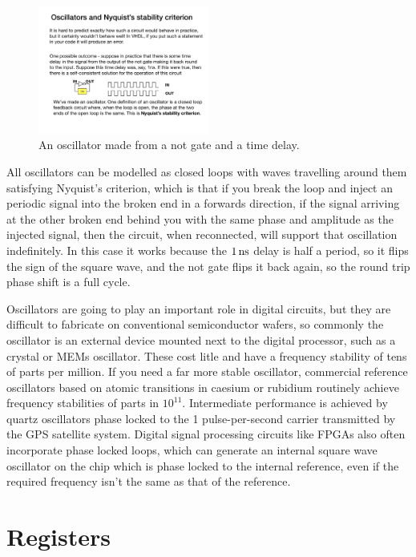 \documentclass[../physical_computing.tex]{subfiles}
\begin{document}
\begin{figure}[htbp]
    \centering
    \includegraphics[width=0.5\textwidth]
    {chapter_2/figures/oscillator_logic.pdf}
    \caption{An oscillator made from a not gate and a time delay.}
    \label{fig:oscillator_logic}
\end{figure}

All oscillators can be modelled as closed loops with waves travelling around them satisfying Nyquist's criterion, which is that if you break the loop and inject an periodic signal into the broken end in a
forwards direction, if the signal arriving at the other broken end behind you with the same phase and amplitude as the injected signal, then the circuit, when reconnected, will support that oscillation indefinitely. In this case it works because the $\rm 1\,ns$ delay is half a period, so it flips the sign of the square wave, and the not
gate flips it back again, so the round trip phase shift is a full
cycle.

Oscillators are going to play an important role in digital circuits, 
but they are difficult to fabricate on conventional semiconductor
wafers, so commonly the oscillator is an external device mounted
next to the digital processor, such as a crystal or MEMs oscillator. These cost litle and have a frequency stability of tens of
parts per million. If you need a far more stable oscillator,
commercial reference oscillators based on atomic transitions in
caesium or rubidium routinely achieve frequency stabilities of
parts in $10^{11}$. Intermediate performance is achieved by
quartz oscillators phase locked to the 1 pulse-per-second 
carrier transmitted by the GPS satellite system. Digital signal
processing circuits like FPGAs also often incorporate phase locked
loops, which can generate an internal square wave oscillator on the
chip which is phase locked to the internal reference, even if the 
required frequency isn't the same as that of the reference. 

\section{Registers}
\label{sec:registers}
\end{document}
